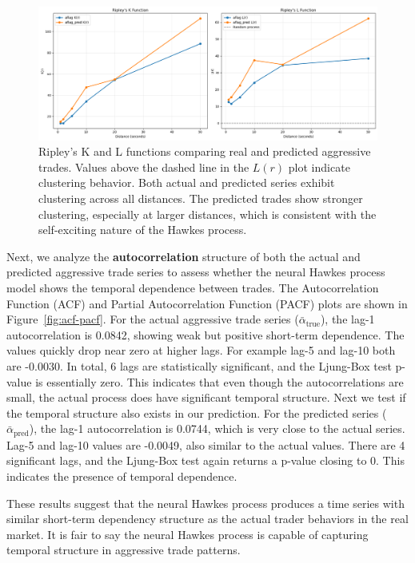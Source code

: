 \begin{figure}[H]
    \centering
    \includegraphics[width=\linewidth]{figures/RIPLEY_181330.png}
    \caption{Ripley's K and L functions comparing real and predicted aggressive trades. Values above the dashed line in the \( L(r) \) plot indicate clustering behavior. Both actual and predicted series exhibit clustering across all distances. The predicted trades show stronger clustering, especially at larger distances, which is consistent with the self-exciting nature of the Hawkes process.}
    \label{fig:ripley-kl}
\end{figure}



Next, we analyze the \textbf{autocorrelation} structure of both the actual and predicted aggressive trade series to assess whether the neural Hawkes process model shows the temporal dependence between trades. The Autocorrelation Function (ACF) and Partial Autocorrelation Function (PACF) plots are shown in Figure~\ref{fig:acf-pacf}. For the actual aggressive trade series ($\bar{\alpha}_\text{true}$), the lag-1 autocorrelation is 0.0842, showing weak but positive short-term dependence. The values quickly drop near zero at higher lags. For example lag-5 and lag-10 both are -0.0030. In total, 6 lags are statistically significant, and the Ljung-Box test p-value is essentially zero. This indicates that even though the autocorrelations are small, the actual process does have significant temporal structure. Next we test if the temporal structure also exists in our prediction. For the predicted series ($\bar{\alpha}_\text{pred}$), the lag-1 autocorrelation is 0.0744, which is very close to the actual series. Lag-5 and lag-10 values are -0.0049, also similar to the actual values. There are 4 significant lags, and the Ljung-Box test again returns a p-value closing to 0. This indicates the presence of temporal dependence.

These results suggest that the neural Hawkes process produces a time series with similar short-term dependency structure as the actual trader behaviors in the real market. It is fair to say the neural Hawkes process is capable of capturing temporal structure in aggressive trade patterns.

